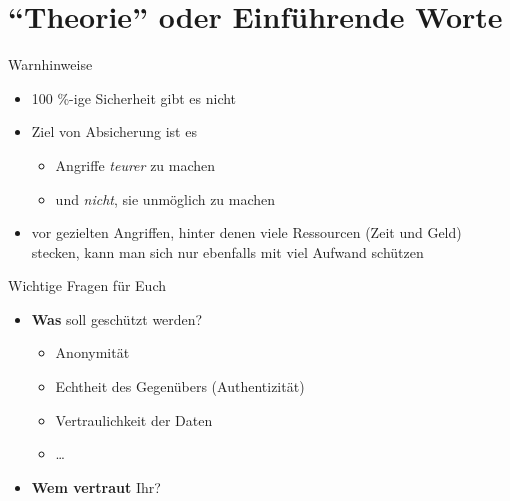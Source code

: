 \section{``Theorie'' oder Einführende Worte}
  \begin{frame}{Warnhinweise}
    \begin{itemize}
      \item 100 \%-ige Sicherheit gibt es nicht
      \item Ziel von Absicherung ist es
      \begin{itemize}
        \item Angriffe \textit{teurer} zu machen
        \item und \textit{nicht}, sie unmöglich zu machen
      \end{itemize}
      \item vor gezielten Angriffen, hinter denen viele Ressourcen (Zeit und Geld) stecken, kann man sich nur ebenfalls mit viel Aufwand schützen
    \end{itemize}
  \end{frame}
  \begin{frame}{Wichtige Fragen für Euch}
    \begin{itemize}
      \item \textbf{Was} soll geschützt werden?
        \begin{itemize}
          \item Anonymität
          \item Echtheit des Gegenübers (Authentizität)
          \item Vertraulichkeit der Daten
          \item \ldots
        \end{itemize}
      \item \textbf{Wem vertraut} Ihr?
    \end{itemize}
  \end{frame}

